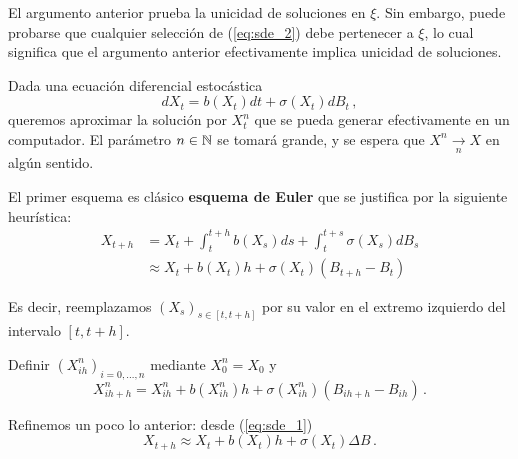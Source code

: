 \begin{remark}
    El argumento anterior prueba la unicidad de soluciones en $\xi$. Sin embargo, puede probarse que cualquier selección de (\ref{eq:sde_2}) debe pertenecer a $\xi$, lo cual significa que el argumento anterior efectivamente implica unicidad de soluciones. 
\end{remark}

Dada una ecuación diferencial estocástica 
\begin{equation*}
    dX_t = b(X_t)dt + \sigma(X_t) dB_t\,,
\end{equation*}
queremos aproximar la solución por $X_t^{n}$ que se pueda generar efectivamente en un computador. 
\newp El parámetro $n \in \mathbb{N}$ se tomará grande, y se espera que $X^{n} \xrightarrow[n]{} X$ en algún sentido. 

El primer esquema es clásico \textbf{esquema de Euler} que se justifica por la siguiente heurística: 
\begin{align*}
    \label{eq:sde_3}
    \tag{*}
    X_{t+h} &= X_t + \int_{t}^{t+h} b(X_s) ds + \int_{t}^{t+s} \sigma(X_s) dB_s \\
            &\approx X_t + b(X_t) h + \sigma(X_t) (B_{t+h} - B_{t})
\end{align*}

Es decir, reemplazamos $(X_s)_{s \in [t,t+h]}$ por su valor en el extremo izquierdo del intervalo $[t,t+h]$.

\begin{algorithm}
\begin{leftbar}
{}
Definir $(X^{n}_{ih})_{i = 0, \ldots, n}$ mediante $X_{0}^{n} = X_0$ y
    \begin{equation*}
            X^{n}_{ih + h} = X^{n}_{ih} + b(X^{n}_{ih})h + \sigma(X^{n}_{ih})(B_{ih + h} - B_{ih})\,.
    \end{equation*}
\end{leftbar}
\end{algorithm}
Refinemos un poco lo anterior: desde (\ref{eq:sde_1})
\begin{equation*}
        X_{t+h} \approx X_t + b(X_t) h + \sigma(X_t) \Delta B\,.
\end{equation*}

